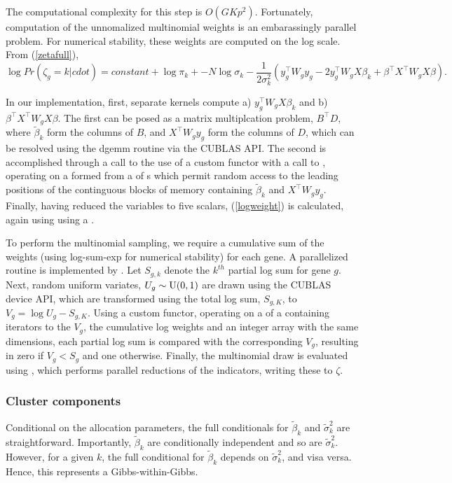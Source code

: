 The computational complexity for this step is $O(GKp^2)$. Fortunately, computation of the unnomalized multinomial weights is an embarassingly parallel problem. For numerical stability, these weights are computed on the log scale. From (\ref{zetafull}),
\begin{equation}
\label{logweight}
\log Pr(\zeta_g=k|cdot) = constant + \log \pi_k + -N \log \sigma_k - \frac{1}{2\sigma^2_k}\left(y_g^\top W_g y_g - 2y_g^\top W_g X \beta_k + \beta^\top X^\top W_g X \beta \right).
\end{equation}

In our implementation, first, separate kernels compute a) $y_g^\top W_g X \beta_k$ and b) $\beta^\top X^\top W_g X \beta$. The first can be posed as a matrix multiplcation problem, $B^\top D$, where $\tilde{\beta}_k$ form the columns of $B$, and $X^\top W_g y_g$ form the columns of $D$, which can be resolved using the dgemm routine via the CUBLAS API. The second is accomplished through a call to the use of a custom functor with a call to , operating on a  formed from a  of s which permit random access to the leading positions of the continguous blocks of memory containing $\tilde{\beta}_k$ and $X^\top W_g y_g$. Finally, having reduced the variables to five scalars, (\ref{logweight}) is calculated, again using  using a .

To perform the multinomial sampling, we require a cumulative sum of the weights (using log-sum-exp for numerical stability) for each gene. A parallelized routine is implemented by . Let $S_{g,k}$ denote the $k^{th}$ partial log sum for gene $g$. Next, random uniform variates, $U_g \sim \operatorname{U}(0,1)$ are drawn using the CUBLAS device API, which are transformed using the total log sum, $S_{g,K}$, to $V_g = \log U_g - S_{g,K}$. Using a custom functor, operating on a  of a  containing iterators to the $V_g$, the cumulative log weights and an integer array with the same dimensions, each partial log sum is compared with the corresponding $V_g$, resulting in zero if $V_g<S_g$ and one otherwise. Finally, the multinomial draw is evaluated using , which performs parallel reductions of the indicators, writing these to $\zeta$.

\subsubsection{Cluster components}
Conditional on the allocation parameters, the full conditionals for $\tilde{\beta}_k$ and $\tilde{\sigma}^2_k$ are straightforward. Importantly, $\tilde{\beta}_k$ are conditionally independent and so are $\tilde{\sigma}^2_k$. However, for a given $k$, the full conditional for $\tilde{\beta}_k$ depends on $\tilde{\sigma}^2_k$, and visa versa. Hence, this represents a Gibbs-within-Gibbs.

